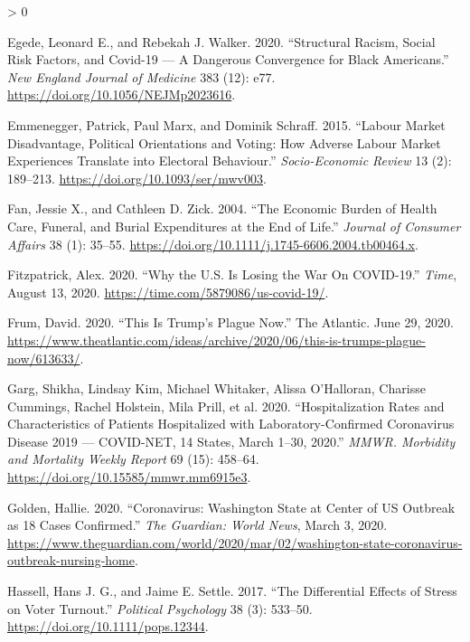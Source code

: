 \documentclass[
  12pt,
]{article}
\newlength{\cslhangindent}
\newenvironment{CSLReferences}[2] %
 {%
  \setlength{\parindent}{0pt}
  \ifodd #1 \everypar{\setlength{\hangindent}{\cslhangindent}}\ignorespaces\fi
  \ifnum #2 > 0
  \setlength{\parskip}{#2\baselineskip}
  \fi
 }%
 {}
\begin{document}
\begin{CSLReferences}{1}{0}
\leavevmode\hypertarget{ref-Egede2020}{}%
Egede, Leonard E., and Rebekah J. Walker. 2020. {``Structural {Racism}, {Social Risk Factors}, and {Covid}-19 --- {A Dangerous Convergence} for {Black Americans}.''} \emph{New England Journal of Medicine} 383 (12): e77. \url{https://doi.org/10.1056/NEJMp2023616}.

\leavevmode\hypertarget{ref-Emmenegger2015}{}%
Emmenegger, Patrick, Paul Marx, and Dominik Schraff. 2015. {``Labour Market Disadvantage, Political Orientations and Voting: How Adverse Labour Market Experiences Translate into Electoral Behaviour.''} \emph{Socio-Economic Review} 13 (2): 189--213. \url{https://doi.org/10.1093/ser/mwv003}.

\leavevmode\hypertarget{ref-Fan2004}{}%
Fan, Jessie X., and Cathleen D. Zick. 2004. {``The {Economic Burden} of {Health Care}, {Funeral}, and {Burial Expenditures} at the {End} of {Life}.''} \emph{Journal of Consumer Affairs} 38 (1): 35--55. \url{https://doi.org/10.1111/j.1745-6606.2004.tb00464.x}.

\leavevmode\hypertarget{ref-Fitzpatrick2020}{}%
Fitzpatrick, Alex. 2020. {``Why the {U}.{S}. {Is Losing} the {War On COVID}-19.''} \emph{Time}, August 13, 2020. \url{https://time.com/5879086/us-covid-19/}.

\leavevmode\hypertarget{ref-Frum2020}{}%
Frum, David. 2020. {``This {Is Trump}'s {Plague Now}.''} {The Atlantic}. June 29, 2020. \url{https://www.theatlantic.com/ideas/archive/2020/06/this-is-trumps-plague-now/613633/}.

\leavevmode\hypertarget{ref-Garg2020}{}%
Garg, Shikha, Lindsay Kim, Michael Whitaker, Alissa O'Halloran, Charisse Cummings, Rachel Holstein, Mila Prill, et al. 2020. {``Hospitalization {Rates} and {Characteristics} of {Patients Hospitalized} with {Laboratory}-{Confirmed Coronavirus Disease} 2019 --- {COVID}-{NET}, 14 {States}, {March} 1--30, 2020.''} \emph{MMWR. Morbidity and Mortality Weekly Report} 69 (15): 458--64. \url{https://doi.org/10.15585/mmwr.mm6915e3}.

\leavevmode\hypertarget{ref-Golden2020}{}%
Golden, Hallie. 2020. {``Coronavirus: {Washington} State at Center of {US} Outbreak as 18 Cases Confirmed.''} \emph{The Guardian: World News}, March 3, 2020. \url{https://www.theguardian.com/world/2020/mar/02/washington-state-coronavirus-outbreak-nursing-home}.

\leavevmode\hypertarget{ref-Hassell2017}{}%
Hassell, Hans J. G., and Jaime E. Settle. 2017. {``The {Differential Effects} of {Stress} on {Voter Turnout}.''} \emph{Political Psychology} 38 (3): 533--50. \url{https://doi.org/10.1111/pops.12344}.


\end{CSLReferences}
\end{document}
